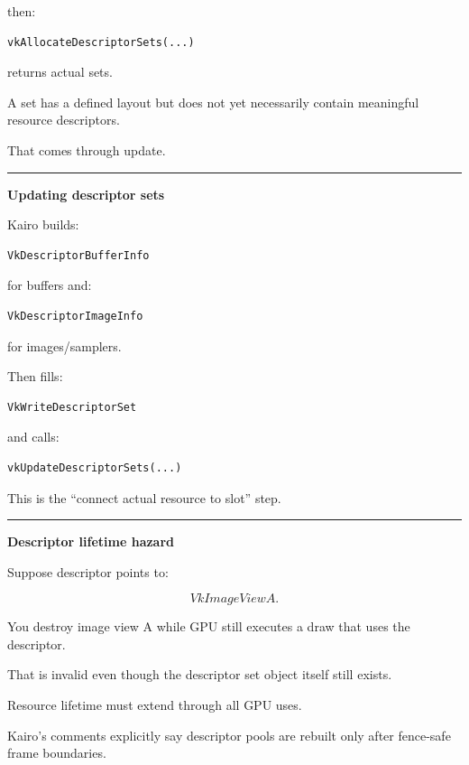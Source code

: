 then:

\begin{verbatim}
vkAllocateDescriptorSets(...)
\end{verbatim}

returns actual sets.

A set has a defined layout but does not yet necessarily contain meaningful resource descriptors.

That comes through update.

\begin{center}\rule{0.5\linewidth}{0.5pt}\end{center}

\textbf{Updating descriptor sets}

Kairo builds:

\begin{verbatim}
VkDescriptorBufferInfo
\end{verbatim}

for buffers and:

\begin{verbatim}
VkDescriptorImageInfo
\end{verbatim}

for images/samplers.

Then fills:

\begin{verbatim}
VkWriteDescriptorSet
\end{verbatim}

and calls:

\begin{verbatim}
vkUpdateDescriptorSets(...)
\end{verbatim}

This is the ``connect actual resource to slot'' step.

\begin{center}\rule{0.5\linewidth}{0.5pt}\end{center}

\textbf{Descriptor lifetime hazard}

Suppose descriptor points to:

\[
VkImageView A.
\]

You destroy image view A while GPU still executes a draw that uses the descriptor.

That is invalid even though the descriptor set object itself still exists.

Resource lifetime must extend through all GPU uses.

Kairo's comments explicitly say descriptor pools are rebuilt only after fence-safe frame boundaries.

